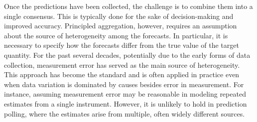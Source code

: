 \documentclass[11pt]{article}
\theoremstyle{definition}
\theoremstyle{definition}
\begin{document}
Once the predictions have been collected, the challenge is to combine them into a single consensus. This is typically done for the sake of decision-making and improved accuracy. Principled aggregation, however, requires an assumption about the source of heterogeneity among the forecasts. In particular, it is necessary to specify how the forecasts differ from the true value of the target quantity. For the past several decades, potentially due to the early forms of data collection, measurement error has served as the main source of heterogeneity. This approach has become the standard and is often applied in practice even when data variation is dominated  by causes besides error in measurement. For instance, assuming measurement error may be reasonable in modeling repeated estimates from a single instrument. However, it is unlikely to hold in prediction polling, where the estimates arise from multiple, often widely different sources. 












%








\end{document}
